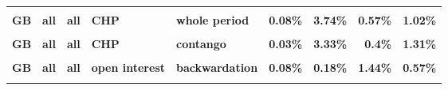 \documentclass[
  authoryear,
  preprint,
  3p]{elsarticle}
\begin{document}
\begin{landscape}
\begin{longtable}[t]{>{}l>{}l>{}l>{}l>{}l>{}r>{}r>{}r>{}r}
\textbf{\cellcolor{gray!10}{GB}} & \textbf{\cellcolor{gray!10}{all}} & \textbf{\cellcolor{gray!10}{all}} & \textbf{\cellcolor{gray!10}{market}} & \textbf{\cellcolor{gray!10}{contango}} & \textcolor[HTML]{4285f4}{\textbf{\cellcolor{gray!10}{1.48\%}}} & \textcolor[HTML]{4285f4}{\textbf{\cellcolor{gray!10}{10.88\%}}} & \textcolor[HTML]{4285f4}{\textbf{\cellcolor{gray!10}{33.45\%}}} & \textcolor[HTML]{4285f4}{\textbf{\cellcolor{gray!10}{14.35\%}}}\\
\textbf{GB} & \textbf{all} & \textbf{all} & \textbf{CHP} & \textbf{whole period} & \textcolor[HTML]{4285f4}{\textbf{0.08\%}} & \textcolor[HTML]{4285f4}{\textbf{3.74\%}} & \textcolor[HTML]{4285f4}{\textbf{0.57\%}} & \textcolor[HTML]{4285f4}{\textbf{1.02\%}}\\
\textbf{\cellcolor{gray!10}{GB}} & \textbf{\cellcolor{gray!10}{all}} & \textbf{\cellcolor{gray!10}{all}} & \textbf{\cellcolor{gray!10}{CHP}} & \textbf{\cellcolor{gray!10}{backwardation}} & \textcolor[HTML]{4285f4}{\textbf{\cellcolor{gray!10}{0.24\%}}} & \textcolor[HTML]{4285f4}{\textbf{\cellcolor{gray!10}{4.26\%}}} & \textcolor[HTML]{4285f4}{\textbf{\cellcolor{gray!10}{1.09\%}}} & \textcolor[HTML]{4285f4}{\textbf{\cellcolor{gray!10}{0.72\%}}}\\
\textbf{GB} & \textbf{all} & \textbf{all} & \textbf{CHP} & \textbf{contango} & \textcolor[HTML]{4285f4}{\textbf{0.03\%}} & \textcolor[HTML]{4285f4}{\textbf{3.33\%}} & \textcolor[HTML]{4285f4}{\textbf{0.4\%}} & \textcolor[HTML]{4285f4}{\textbf{1.31\%}}\\
\addlinespace
\textbf{\cellcolor{gray!10}{GB}} & \textbf{\cellcolor{gray!10}{all}} & \textbf{\cellcolor{gray!10}{all}} & \textbf{\cellcolor{gray!10}{open interest}} & \textbf{\cellcolor{gray!10}{whole period}} & \textcolor[HTML]{4285f4}{\textbf{\cellcolor{gray!10}{0.07\%}}} & \textcolor[HTML]{4285f4}{\textbf{\cellcolor{gray!10}{0.34\%}}} & \textcolor[HTML]{4285f4}{\textbf{\cellcolor{gray!10}{2.17\%}}} & \textcolor[HTML]{4285f4}{\textbf{\cellcolor{gray!10}{0.42\%}}}\\
\textbf{GB} & \textbf{all} & \textbf{all} & \textbf{open interest} & \textbf{backwardation} & \textcolor[HTML]{4285f4}{\textbf{0.08\%}} & \textcolor[HTML]{4285f4}{\textbf{0.18\%}} & \textcolor[HTML]{4285f4}{\textbf{1.44\%}} & \textcolor[HTML]{4285f4}{\textbf{0.57\%}}\\
\textbf{\cellcolor{gray!10}{GB}} & \textbf{\cellcolor{gray!10}{all}} & \textbf{\cellcolor{gray!10}{all}} & \textbf{\cellcolor{gray!10}{open interest}} & \textbf{\cellcolor{gray!10}{contango}} & \textcolor[HTML]{4285f4}{\textbf{\cellcolor{gray!10}{0.22\%}}} & \textcolor[HTML]{4285f4}{\textbf{\cellcolor{gray!10}{0.59\%}}} & \textcolor[HTML]{4285f4}{\textbf{\cellcolor{gray!10}{2.7\%}}} & \textcolor[HTML]{4285f4}{\textbf{\cellcolor{gray!10}{0.39\%}}}\\

\end{longtable}
\end{landscape}
\end{document}
